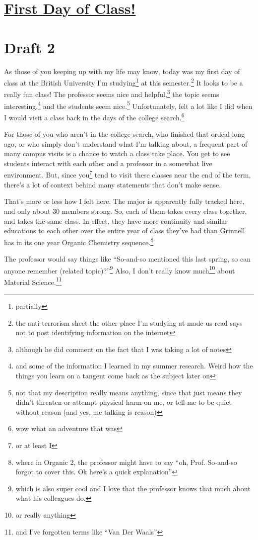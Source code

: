 \documentclass[12pt]{article}[titlepage]
\newcommand{\say}[1]{``#1''}
\newcommand{\1}{\={a}}
\newcommand{\2}{\={e}}
\newcommand{\3}{\={\i}}
\newcommand{\4}{\=o}
\newcommand{\5}{\=u}
\newcommand{\6}{\={A}}
\renewcommand{\,}{\textsuperscript{,}}
\begin{document}
\doublespacing
\section{\href{first-day-of-class.html}{First Day of Class!}}
\section{Draft 2}
As those of you keeping up with my life may know, today was my first day of class at the British University I'm studying\footnote{partially} at this semester.\footnote{the anti-terrorism sheet the other place I'm studying at made us read says not to post identifying information on the internet}
It looks to be a really fun class!
The professor seems nice and helpful,\footnote{although he did comment on the fact that I was taking a lot of notes} the topic seems interesting,\footnote{and some of the information I learned in my summer research. Weird how the things you learn on a tangent come back as the subject later on} and the students seem nice.\footnote{not that my description really means anything, since that just means they didn't threaten or attempt physical harm on me, or tell me to be quiet without reason (and yes, me talking is reason)}
Unfortunately, felt a lot like I did when I would visit a class back in the days of the college search.\footnote{wow what an adventure that was}

For those of you who aren't in the college search,  who finished that ordeal long ago, or who simply don't understand what I'm talking about, a frequent part of many campus visits is a chance to watch a class take place.
You get to see students interact with each other and a professor in a somewhat live environment.
But, since you\footnote{or at least I} tend to visit these classes near the end of the term, there's a lot of context behind many statements that don't make sense.

That's more or less how I felt here.
The major is apparently fully tracked here, and only about 30 members strong.
So, each of them takes every class together, and takes the same class.
In effect, they have more continuity and similar educations to each other over the entire year of class they've had than Grinnell has in its one year Organic Chemistry sequence.\footnote{where in Organic 2, the professor might have to say \say{oh, Prof. So-and-so forgot to cover this. Ok here's a quick explanation}}

The professor would say things like \say{So-and-so mentioned this last spring, so can anyone remember (related topic)?}\footnote{which is also super cool and I love that the professor knows that much about what his colleagues do.}
Also, I don't really know much\footnote{or really anything} about Material Science.\footnote{and I've forgotten terms like \say{Van Der Waals}}
\end{document}
